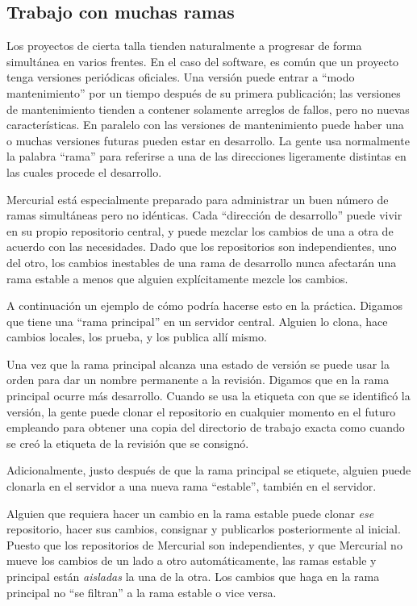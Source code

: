 \subsection{Trabajo con muchas ramas}

Los proyectos de cierta talla tienden naturalmente a progresar de
forma simultánea en varios frentes. En el caso del software, es común
que un proyecto tenga versiones periódicas oficiales. Una versión
puede entrar a ``modo mantenimiento'' por un tiempo después de su
primera publicación; las versiones de mantenimiento tienden a contener
solamente arreglos de fallos, pero no nuevas características. En
paralelo con las versiones de mantenimiento puede haber una o muchas
versiones futuras pueden estar en desarrollo. La gente usa normalmente
la palabra ``rama'' para referirse a una de las direcciones
ligeramente distintas en las cuales procede el desarrollo.

Mercurial está especialmente preparado para administrar un buen número
de ramas simultáneas pero no idénticas. Cada ``dirección de
desarrollo'' puede vivir en su propio repositorio central, y puede
mezclar los cambios de una a otra de acuerdo con las necesidades. Dado
que los repositorios son independientes, uno del otro, los cambios
inestables de una rama de desarrollo nunca afectarán una rama estable
a menos que alguien explícitamente mezcle los cambios.

A continuación un ejemplo de cómo podría hacerse esto en la
práctica. Digamos que tiene una ``rama principal'' en un servidor
central.
Alguien lo clona, hace cambios locales, los prueba, y los publica allí
mismo.

Una vez que la rama principal alcanza una estado de versión se puede
usar la orden  para dar un nombre permanente a la revisión.
Digamos que en la rama principal ocurre más desarrollo.
Cuando se usa la etiqueta con que se identificó la versión, la gente
puede clonar el repositorio en cualquier momento en el futuro
empleando  para obtener una copia del directorio de
trabajo exacta como cuando se creó la etiqueta de la revisión que se
consignó.

Adicionalmente, justo después de que la rama principal se etiquete,
alguien puede clonarla en el servidor a una nueva rama ``estable'',
también en el servidor.

Alguien que requiera hacer un cambio en la rama estable puede clonar
\emph{ese} repositorio, hacer sus cambios, consignar y publicarlos
posteriormente al inicial.
Puesto que los repositorios de Mercurial son independientes, y que
Mercurial no mueve los cambios de un lado a otro automáticamente, las
ramas estable y principal están \emph{aisladas} la una de la otra.
Los cambios que haga en la rama principal no ``se filtran'' a la rama
estable o vice versa.

